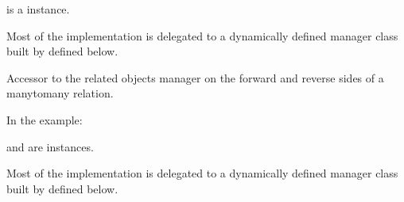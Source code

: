 \documentclass[letterpaper,10pt,english,openany,oneside]{sphinxmanual}
\begin{document}
\begin{fulllineitems}
\begin{fulllineitems}
 is a  instance.

Most of the implementation is delegated to a dynamically defined manager
class built by  defined below.

\end{fulllineitems}


\begin{fulllineitems}
\label{\detokenize{modules/models:users.models.CustomUser.user_permissions}}
Accessor to the related objects manager on the forward and reverse sides of
a many\sphinxhyphen{}to\sphinxhyphen{}many relation.

In the example:

\begin{sphinxVerbatim}[commandchars=\\\{\}]
 
       
\end{sphinxVerbatim}

 and  are 
instances.

Most of the implementation is delegated to a dynamically defined manager
class built by  defined below.

\end{fulllineitems}


\end{fulllineitems}

\end{document}
